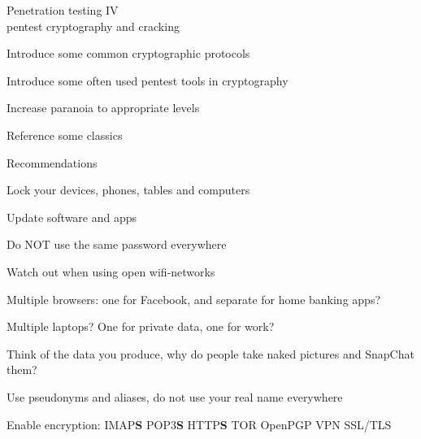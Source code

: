 \documentclass[20pt,landscape,a4paper,footrule]{foils}
\begin{document}
\mytitlepage
{Penetration testing IV\\pentest cryptography and cracking}




\LogoOn





\begin{list1}
\item Introduce some common cryptographic protocols
\item Introduce some often used pentest tools in cryptography
\item Increase paranoia to appropriate levels \smiley
\item Reference some classics
\end{list1}


Recommendations 
\begin{list2}
\item Lock your devices, phones, tables and computers
\item Update software and apps
\item Do NOT use the same password everywhere
\item Watch out when using open wifi-networks
\item Multiple browsers: one for Facebook, and separate for home banking apps?
\item Multiple laptops? One for private data, one for work?
\item Think of the data you produce, why do people take naked pictures and SnapChat them?
\item Use pseudonyms and aliases, do not use your real name everywhere
\item Enable encryption: IMAP{\bf S} POP3{\bf S}
  HTTP{\bf S} TOR OpenPGP VPN SSL/TLS
\end{list2}





\end{document}
